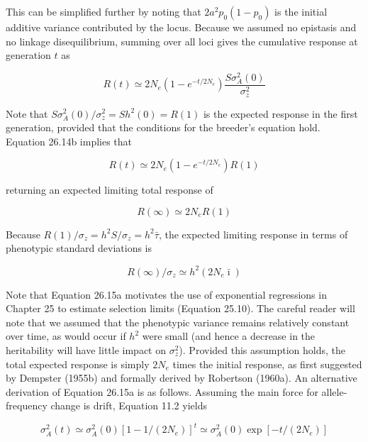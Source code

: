 \documentclass{article}
\begin{document}
This can be simplified further by noting that  $ 2a^2p_0(1 - p_0) $ is the initial additive variance contributed by the locus. Because we assumed no epistasis and no linkage disequilibrium, summing over all loci gives the cumulative response at generation  $ t $ as

\begin{equation}
R(t)\simeq2N_{e}\left(1-e^{-t/2N_{e}}\right)\frac{S\sigma_{A}^{2}(0)}{\sigma_{z}^{2}}
\tag{26.14b}
\label{eq:26_14b}
\end{equation}

Note that  $ S \sigma_A^2(0) / \sigma_z^2 = S h^2(0) = R(1) $ is the expected response in the first generation, provided that the conditions for the breeder's equation hold. Equation 26.14b implies that

\begin{equation}
R(t)\simeq2N_{e}\left(1-e^{-t/2N_{e}}\right)R(1)
\tag{26.15a}
\label{eq:26_15a}
\end{equation}

returning an expected limiting total response of

\begin{equation}
R(\infty)\simeq2N_{e}R(1)
\tag{26.15b}
\label{eq:26_15b}
\end{equation}

Because  $  R(1)/\sigma_z = h^2 S/\sigma_z = h^2 \bar{\tau}  $, the expected limiting response in terms of phenotypic standard deviations is

\begin{equation}
R(\infty)/\sigma_{z}\simeq h^{2}(2N_{e}\bar{\imath})
\tag{26.15c}
\label{eq:26_15c}
\end{equation}

Note that Equation 26.15a motivates the use of exponential regressions in Chapter 25 to estimate selection limits (Equation 25.10). The careful reader will note that we assumed that the phenotypic variance remains relatively constant over time, as would occur if  $ h^2 $ were small (and hence a decrease in the heritability will have little impact on  $ \sigma_z^2 $). Provided this assumption holds, the total expected response is simply  $ 2N_e $ times the initial response, as first suggested by Dempster (1955b) and formally derived by Robertson (1960a). An alternative derivation of Equation 26.15a is as follows. Assuming the main force for allele-frequency change is drift, Equation 11.2 yields

\begin{equation}
\sigma_{A}^{2}(t)\simeq\sigma_{A}^{2}(0)[1-1/(2N_{e})]^{t}\simeq\sigma_{A}^{2}(0)\exp\left[-t/(2N_{e})\right]
\tag{26.15d}
\label{eq:26_15d}
\end{equation}
\end{document}
